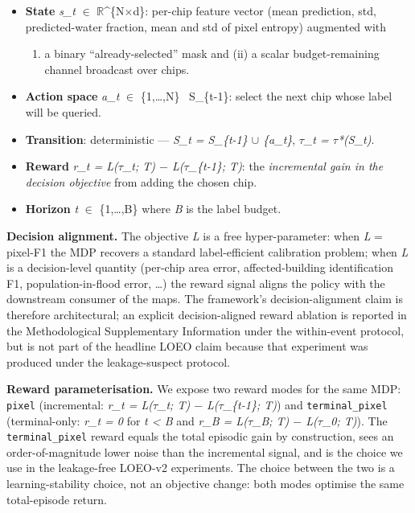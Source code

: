 \begin{itemize}
\tightlist
\item
  \textbf{State} \emph{s\_t} $\in$ $\mathbb{R}$\^{}\{N$\times$d\}: per-chip feature vector (mean prediction, std,
  predicted-water fraction, mean and std of pixel entropy) augmented with

  \begin{enumerate}
  \def\labelenumi{(\roman{enumi})}
  \tightlist
  \item
    a binary ``already-selected'' mask and (ii) a scalar
    budget-remaining channel broadcast over chips.
  \end{enumerate}
\item
  \textbf{Action space} \emph{a\_t} $\in$ \{1,\ldots,N\} ~S\_\{t-1\}: select the next chip whose
  label will be queried.
\item
  \textbf{Transition}: deterministic --- \emph{S\_t = S\_\{t-1\} $\cup$ \{a\_t\}}, \emph{$\tau$\_t = $\tau$*(S\_t)}.
\item
  \textbf{Reward} \emph{r\_t = L($\tau$\_t; T) $-$ L($\tau$\_\{t-1\}; T)}: the \emph{incremental gain in the
  decision objective} from adding the chosen chip.
\item
  \textbf{Horizon} \emph{t} $\in$ \{1,\ldots,B\} where \emph{B} is the label budget.
\end{itemize}

\textbf{Decision alignment.} The objective \emph{L} is a free hyper-parameter: when
\emph{L} = pixel-F1 the MDP recovers a standard label-efficient calibration
problem; when \emph{L} is a decision-level quantity (per-chip area error,
affected-building identification F1, population-in-flood error, \ldots) the
reward signal aligns the policy with the downstream consumer of the maps.
The framework's decision-alignment claim is therefore architectural; an
explicit decision-aligned reward ablation is reported in the Methodological
Supplementary Information under the within-event protocol, but is not part of
the headline LOEO claim because that experiment was produced under the
leakage-suspect protocol.

\textbf{Reward parameterisation.} We expose two reward modes for the same MDP:
\texttt{pixel} (incremental: \emph{r\_t = L($\tau$\_t; T) $-$ L($\tau$\_\{t-1\}; T)}) and
\texttt{terminal\_pixel} (terminal-only: \emph{r\_t = 0} for \emph{t \textless{} B} and
\emph{r\_B = L($\tau$\_B; T) $-$ L($\tau$\_0; T)}). The \texttt{terminal\_pixel} reward equals the
total episodic gain by construction, sees an order-of-magnitude lower noise
than the incremental signal, and is the choice we use in the leakage-free
LOEO-v2 experiments. The choice between the two is a learning-stability
choice, not an objective change: both modes optimise the same total-episode
return.

